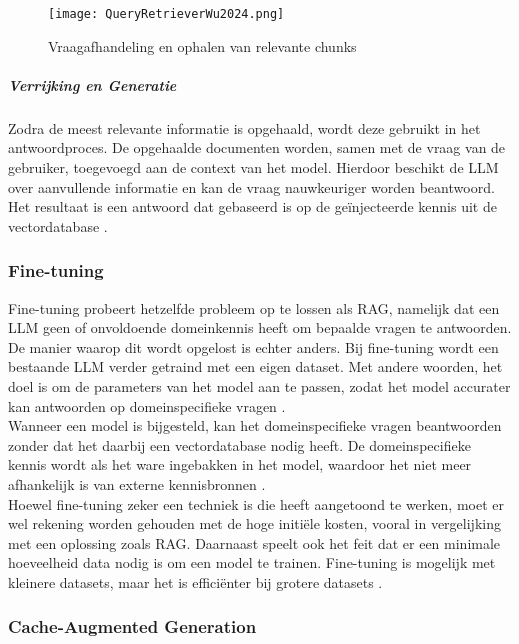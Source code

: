 \begin{figure}[H]
    \centering
    \texttt{[image: QueryRetrieverWu2024.png]}
    \caption{Vraagafhandeling en ophalen van relevante chunks \autocite{wu2025retrievalaugmentedgenerationnaturallanguage}}
    \label{fig:RAG bevragen vectordatabase}
\end{figure}

\subparagraph{Verrijking en Generatie}

Zodra de meest relevante informatie is opgehaald, wordt deze gebruikt in het antwoordproces. De opgehaalde documenten worden, samen met de vraag van de gebruiker, toegevoegd aan de context van het model. Hierdoor beschikt de LLM over aanvullende informatie en kan de vraag nauwkeuriger worden beantwoord. Het resultaat is een antwoord dat gebaseerd is op de geïnjecteerde kennis uit de vectordatabase \autocite{zhao2024retrievalaugmentedgenerationaigeneratedcontent}.


\subsubsection{Fine-tuning}

Fine-tuning probeert hetzelfde probleem op te lossen als RAG, namelijk dat een LLM geen of onvoldoende domeinkennis heeft om bepaalde vragen te antwoorden. De manier waarop dit wordt opgelost is echter anders. Bij fine-tuning wordt een bestaande LLM verder getraind met een eigen dataset. Met andere woorden, het doel is om de parameters van het model aan te passen, zodat het model accurater kan antwoorden op domeinspecifieke vragen \autocite{Raj2024}.
\\[1em]
Wanneer een model is bijgesteld, kan het domeinspecifieke vragen beantwoorden zonder dat het daarbij een vectordatabase nodig heeft. De domeinspecifieke kennis wordt als het ware ingebakken in het model, waardoor het niet meer afhankelijk is van externe kennisbronnen \autocite{Raj2024}.
\\[1em]
Hoewel fine-tuning zeker een techniek is die heeft aangetoond te werken, moet er wel rekening worden gehouden met de hoge initiële kosten, vooral in vergelijking met een oplossing zoals RAG. Daarnaast speelt ook het feit dat er een minimale hoeveelheid data nodig is om een model te trainen. Fine-tuning is mogelijk met kleinere datasets, maar het is efficiënter bij grotere datasets \autocite{Balaguer2024}.

\subsubsection{Cache-Augmented Generation}

